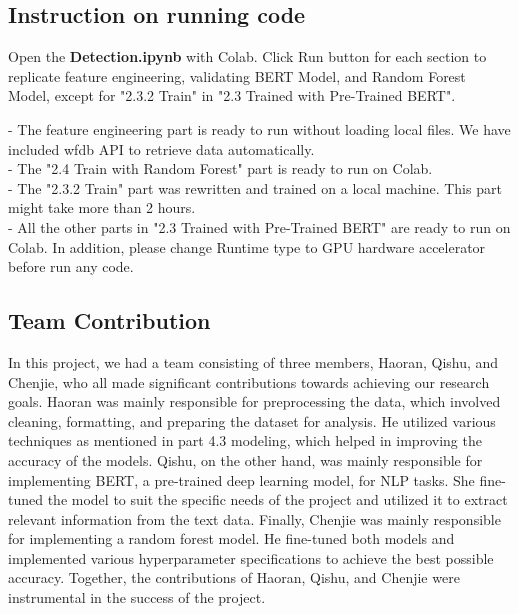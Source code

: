 \subsection{Instruction on running code}

Open the \textbf{Detection.ipynb} with Colab. Click Run button for each section to replicate feature engineering, validating BERT Model, and Random Forest Model, except for "2.3.2 Train" in "2.3 Trained with Pre-Trained BERT".

- The feature engineering part is ready to run without loading local files. We have included wfdb API to retrieve data automatically. \\
- The "2.4 Train with Random Forest" part is ready to run on Colab. \\
- The "2.3.2 Train" part was rewritten and trained on a local machine. This part might take more than 2 hours. \\
- All the other parts in "2.3 Trained with Pre-Trained BERT" are ready to run on Colab. In addition, please change Runtime type to GPU hardware accelerator before run any code.

\subsection{Team Contribution}
In this project, we had a team consisting of three members, Haoran, Qishu, and Chenjie, who all made significant contributions towards achieving our research goals. Haoran was mainly responsible for preprocessing the data, which involved cleaning, formatting, and preparing the dataset for analysis. He utilized various techniques as mentioned in part 4.3 modeling, which helped in improving the accuracy of the models. Qishu, on the other hand, was mainly responsible for implementing BERT, a pre-trained deep learning model, for NLP tasks. She fine-tuned the model to suit the specific needs of the project and utilized it to extract relevant information from the text data. Finally, Chenjie was mainly responsible for implementing a random forest model. He fine-tuned both models and implemented various hyperparameter specifications to achieve the best possible accuracy. Together, the contributions of Haoran, Qishu, and Chenjie were instrumental in the success of the project.